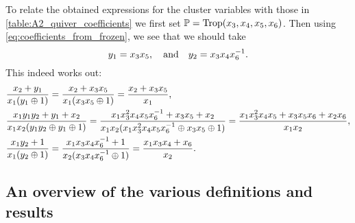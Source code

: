 \begin{example}
	To relate the obtained expressions for the cluster variables with those in
	\cref{table:A2_quiver_coefficients} we first set $\mathbb{P} = \operatorname{Trop}(x_3, x_4, x_5, x_6)$.
	Then using \cref{eq:coefficients_from_frozen}, we see that we should take
	\begin{equation*}
		y_1 = x_3x_5, \quad \text{and} \quad y_2 = x_3x_4x_6^{-1}.
	\end{equation*}
	This indeed works out:
	\begin{align*}
		 & \frac{x_2 + y_1}{x_1(y_1 \oplus 1)} = \frac{x_2 + x_3 x_5}{x_1(x_3x_5\oplus 1)} = \frac{x_2 + x_3 x_5}{x_1},                                                                                                                       \\
		 & \frac{x_1y_1y_2 + y_1 + x_2}{x_1x_2(y_1y_2 \oplus y_1 \oplus 1)} = \frac{x_1x_3^2x_4x_5x_6^{-1} + x_3x_5 + x_2}{x_1x_2(x_1x_3^2x_4x_5x_6^{-1} \oplus x_3 x_5 \oplus 1)} = \frac{x_1 x_3^2 x_4 x_5 + x_3 x_5 x_6 + x_2 x_6}{x_1 x_2}, \\
		 & \frac{x_1 y_2 + 1}{x_1 (y_2 \oplus 1)} = \frac{x_1 x_3 x_4 x_6^{-1} + 1}{x_2 (x_3 x_4 x_6^{-1} \oplus 1)} = \frac{x_1 x_3 x_4 + x_6}{x_2}.
	\end{align*}
\end{example}

\subsection{An overview of the various definitions and results}

